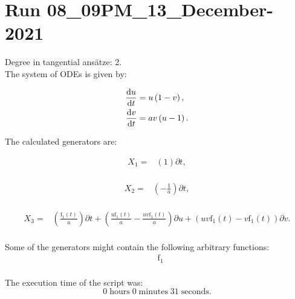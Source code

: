 \section*{Run 08\_09PM\_13\_December-2021}
Degree in tangential ansätze:	2.\\
The system of ODEs is given by:

\begin{align*}
\dv{u}{t}&=u \left(1 - v\right),\\
\dv{v}{t}&=a v \left(u - 1\right).\\
\end{align*}

\noindent The calculated generators are:

\begin{align*}
X_{1}=&\left(1 \right)\partial t,\\
\end{align*}

\begin{align*}
X_{2}=&\left(- \frac{1}{a} \right)\partial t,\\
\end{align*}

\begin{align*}
X_{3}=&\left(\frac{\operatorname{f_{1}}{\left(t \right)}}{a} \right)\partial t+\left(\frac{u \operatorname{f_{1}}{\left(t \right)}}{a}- \frac{u v \operatorname{f_{1}}{\left(t \right)}}{a} \right)\partial u+\left(u v \operatorname{f_{1}}{\left(t \right)} - v \operatorname{f_{1}}{\left(t \right)} \right)\partial v.\\
\end{align*}



\noindent Some of the generators might contain the following arbitrary functions:
\begin{align*}
&\operatorname{f_{1}}\\
\end{align*}

\noindent The execution time of the script was:
$$0\;\mathrm{hours}\;0\;\mathrm{minutes}\;31 \;\mathrm{seconds}.$$
